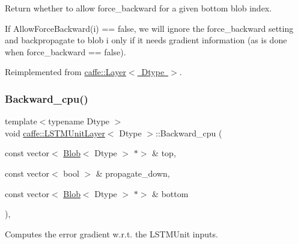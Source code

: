 Return whether to allow force\+\_\+backward for a given bottom blob index. 

If Allow\+Force\+Backward(i) == false, we will ignore the force\+\_\+backward setting and backpropagate to blob i only if it needs gradient information (as is done when force\+\_\+backward == false). 

Reimplemented from \mbox{\hyperlink{classcaffe_1_1_layer_a1c0b2bffcd6d57e4bd49f820941badb6}{caffe\+::\+Layer$<$ Dtype $>$}}.

\mbox{\label{classcaffe_1_1_l_s_t_m_unit_layer_aab97af46aeebdae3d7f7046aa6ba5f7f}} 
\subsubsection{\texorpdfstring{Backward\+\_\+cpu()}{Backward\_cpu()}\hspace{0.1cm}{\footnotesize\ttfamily [1/2]}}
{\footnotesize\ttfamily template$<$typename Dtype $>$ \\
void \mbox{\hyperlink{classcaffe_1_1_l_s_t_m_unit_layer}{caffe\+::\+L\+S\+T\+M\+Unit\+Layer}}$<$ Dtype $>$\+::Backward\+\_\+cpu (\begin{DoxyParamCaption}\item[{const vector$<$ \mbox{\hyperlink{classcaffe_1_1_blob}{Blob}}$<$ Dtype $>$ $\ast$$>$ \&}]{top,  }\item[{const vector$<$ bool $>$ \&}]{propagate\+\_\+down,  }\item[{const vector$<$ \mbox{\hyperlink{classcaffe_1_1_blob}{Blob}}$<$ Dtype $>$ $\ast$$>$ \&}]{bottom }\end{DoxyParamCaption})\hspace{0.3cm}{\ttfamily [protected]}, {\ttfamily [virtual]}}



Computes the error gradient w.\+r.\+t. the L\+S\+T\+M\+Unit inputs. 


